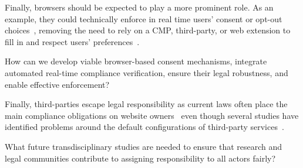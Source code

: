 Finally, browsers should be expected to play a more prominent role. As an example, they could technically enforce in real time users' consent or opt-out choices~\cite{papadogiannakisUserTrackingPostcookie2021,bollingerAutomatingCookieConsent2022,bouhoulaAutomatedLargeScaleAnalysis2024}, removing the need to rely on a CMP, third-party, or web extension to fill in and respect users' preferences~\cite{azizJohnnyStillCant2024,demirLargeScaleStudyCookie2024}.

\begin{opbox}
How can we develop viable browser-based consent mechanisms, integrate automated real-time compliance verification, ensure their legal robustness, and enable effective enforcement?
\end{opbox}


 Finally, third-parties escape legal responsibility as current laws often place the main compliance obligations on website owners~\cite{santosConsentManagementPlatforms2021} even though several studies have identified problems around the default configurations of third-party services~\cite{Koch-etal-25-PETs,Rodr-etal-25-PETs,tothDarkPatternsManipulation2022}.

\begin{opbox}
What future transdisciplinary studies are needed to ensure that research and legal communities contribute to assigning responsibility to all actors fairly?
\end{opbox}


